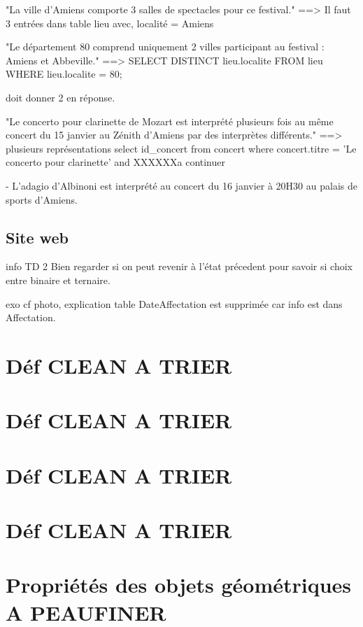 \documentclass[12pt,a4paper]{article}
\begin{document}
{"La ville d'Amiens comporte 3 salles de spectacles pour ce festival."
==> Il faut 3 entrées dans table lieu avec, localité = Amiens



"Le département 80 comprend uniquement 2 villes participant au festival : Amiens et Abbeville."
==> 
SELECT DISTINCT lieu.localite
FROM lieu
WHERE lieu.localite = 80;

doit donner 2 en réponse.



"Le concerto pour clarinette de Mozart est interprété plusieurs fois au même concert du 15 janvier au Zénith d'Amiens par des interprètes différents."
==> plusieurs représentations 
select id_concert
from concert
where concert.titre = 'Le concerto pour clarinette' and XXXXXXa continuer



- L'adagio d'Albinoni est interprété au concert du 16 janvier à 20H30 au palais de sports d'Amiens.




\subsection{Site web}


info TD 2
Bien regarder si on peut revenir à l'état précedent pour savoir si choix entre binaire et ternaire.


exo
cf photo, explication table DateAffectation est supprimée car info est dans Affectation.


\section{Déf CLEAN A TRIER }
\section{Déf CLEAN A TRIER }
\section{Déf CLEAN A TRIER }
\section{Déf CLEAN A TRIER }




\section{Propriétés des objets géométriques A PEAUFINER}







}
\end{document}
